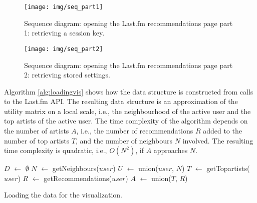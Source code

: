 
\begin{figure}%
	\begin{center}
		\texttt{[image: img/seq\_part1]}%
	\end{center}
	\caption{Sequence diagram: opening the Last.fm recommendations page part 1: retrieving a session key.}%
	\label{fig:sequence:part1}%
\end{figure}

\begin{figure}%
	\begin{center}
		\texttt{[image: img/seq\_part2]}%
	\end{center}
	\caption{Sequence diagram: opening the Last.fm recommendations page part 2: retrieving stored settings.}%
	\label{fig:sequence:part2}%
\end{figure}


Algorithm \ref{alg:loadingvis} shows how the data structure is constructed from calls to the Last.fm API. The resulting data structure is an approximation of the utility matrix on a local scale, i.e., the neighbourhood of the active user and the top artists of the active user. The time complexity of the algorithm depends on the number of artists $A$, i.e., the number of recommendations $R$ added to the number of top artists $T$, and the number of neighbours $N$ involved. The resulting time complexity is quadratic, i.e., $O(N^2)$, if $A$ approaches $N$.



\begin{algorithm}[H]
		\SetAlgoLined
		$D$ $\leftarrow$ $\emptyset$ \;
		$N$ $\leftarrow$ getNeighbours($user$)\;
		$U$ $\leftarrow$ union($user$, $N$)\;
		$T$ $\leftarrow$ getTopartists($user$)\;
		$R$ $\leftarrow$ getRecommendations($user$)\;
		$A$ $\leftarrow$ union($T$, $R$)\;
	\caption{Loading the data for the visualization.}
	\label{alg:loadingvis}
\end{algorithm}


